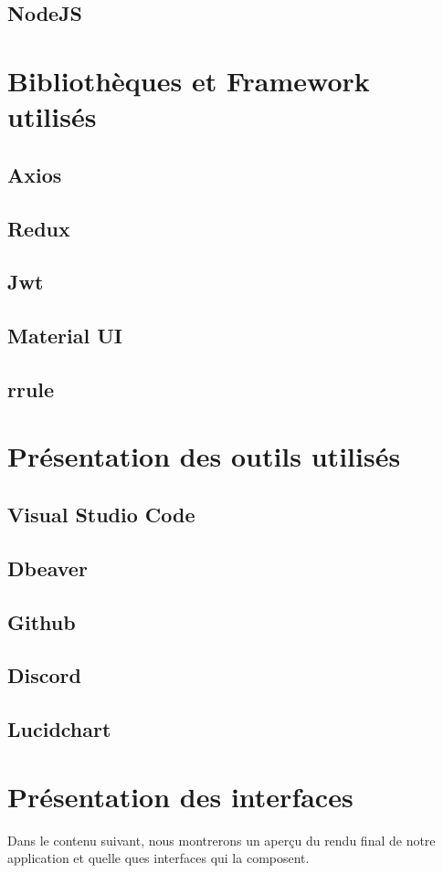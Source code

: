     \subsection{NodeJS}

\section{Bibliothèques et Framework utilisés}
    \subsection{Axios}
    \subsection{Redux}
    \subsection{Jwt}
    \subsection{Material UI}
    \subsection{rrule}

\section{Présentation des outils utilisés}
    \subsection{Visual Studio Code}
    \subsection{Dbeaver}
    \subsection{Github}
    \subsection{Discord}
    \subsection{Lucidchart}

\section{Présentation des interfaces}
    Dans le contenu suivant, nous montrerons un aperçu du rendu final de notre application et quelle ques interfaces qui la composent.

